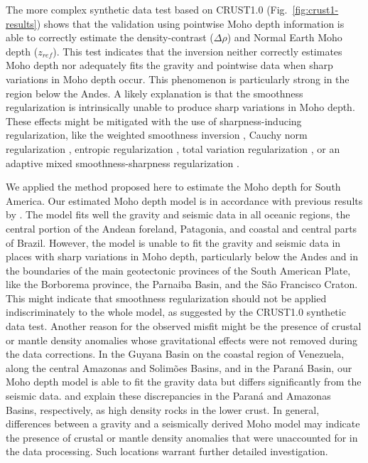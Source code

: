 \documentclass[extra,mreferee]{gji}
\begin{document}
The more complex synthetic data test based on CRUST1.0
(Fig.~\ref{fig:crust1-results})
shows that the validation using pointwise Moho depth information
is able to correctly estimate the density-contrast ($\Delta\rho$) and Normal
Earth Moho depth ($z_{ref}$).
This test indicates that the inversion neither correctly estimates Moho depth
nor adequately fits the gravity and pointwise data when sharp variations in
Moho depth occur.
This phenomenon is particularly strong in the region below the Andes.
A likely explanation is that the smoothness regularization
is intrinsically unable to produce sharp variations in Moho depth.
These effects might be mitigated with the use of sharpness-inducing
regularization, like
the weighted smoothness inversion \citep{barbosa1999a},
Cauchy norm regularization \citep{sacchi1996, pilkington2008},
entropic regularization \citep{silva2010},
total variation regularization \citep{martins2011},
or an adaptive mixed smoothness-sharpness regularization \citep{sun2014}.

We applied the method proposed here to estimate the Moho depth for South
America.
Our estimated Moho depth model is in accordance with previous results by
\citet{vandermeijde2013}.
The model fits well the gravity and seismic data in all oceanic regions, the
central portion of the Andean foreland, Patagonia, and coastal and central
parts of Brazil.
However, the model is unable to fit the gravity and seismic data in places with
sharp variations in Moho depth, particularly below the Andes and in the
boundaries of the main geotectonic provinces of the South American Plate, like
the Borborema province, the Parnaiba Basin, and the São Francisco Craton.
This might indicate that smoothness regularization should not be applied
indiscriminately to the whole model, as suggested by the CRUST1.0 synthetic
data test.
Another reason for the observed misfit might be the presence of crustal or
mantle density anomalies whose gravitational effects were not removed during
the data corrections.
In the Guyana Basin on the coastal region of Venezuela, along the central
Amazonas and Solimões Basins, and in the Paraná Basin, our Moho depth model is
able to fit the gravity data but differs significantly from the seismic data.
\citet{mariani2013} and \citet{nunn1988} explain these discrepancies in the
Paraná and Amazonas Basins, respectively, as high density rocks in the lower
crust.
In general, differences between a gravity and a seismically derived Moho model
may indicate the presence of crustal or mantle density anomalies that were
unaccounted for in the data processing.
Such locations warrant further detailed investigation.
\end{document}
